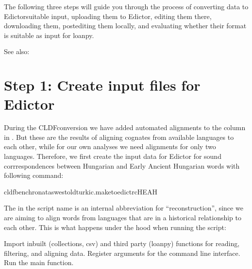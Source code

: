 \documentclass[letterpaper,10pt,english]{sphinxmanual}
\begin{document}
{{{{\sphinxAtStartPar
The following three steps will guide you through the process of converting
data to Edictor\sphinxhyphen{}suitable input, uploading them to Edictor, editing them there,
downloading them, post\sphinxhyphen{}editing them locally, and evaluating whether their
format is suitable as input for loanpy.


\begin{sphinxseealso}{See also:}

\sphinxAtStartPar
{}

\sphinxAtStartPar
{}


\end{sphinxseealso}



\section{Step 1: Create input files for Edictor}
\label{\detokenize{mkedictor:step-1-create-input-files-for-edictor}}
\sphinxAtStartPar
During the CLDF\sphinxhyphen{}conversion we have added automated alignments to the column
 in . But these are the results of aligning
cognates from  available languages to each other, while for our own
analyses we need alignments for only two languages. Therefore, we
first create the input data for Edictor for sound corrrespondences between
Hungarian and Early Ancient Hungarian words with following command:

\begin{sphinxVerbatim}[commandchars=\\\{\}]
cldfbenchronataswestoldturkic.maketoedict\PYGZus{}rcHEAH
\end{sphinxVerbatim}

\sphinxAtStartPar
The  in the script name is an internal abbreviation for “reconstruction”,
since we are aiming to align words from languages that are in a historical
relationship to each other. This is what happens under the hood when running
the script:

\label{\detokenize{mkedictor:module-ronataswestoldturkiccommands.maketoedict_rc}}
\sphinxAtStartPar
Import inbuilt (collections, csv) and third party (loanpy)
functions for reading, filtering, and aligning
data. Register arguments for the command line interface.
Run the main function.

}}}}
\end{document}
